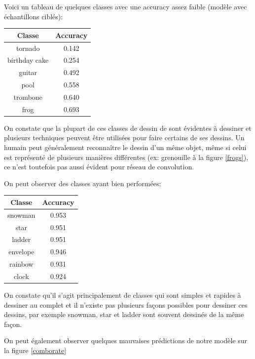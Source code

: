 Voici un tableau de quelques classes avec une accuracy assez faible (modèle avec échantillons ciblés):
\begin{center}
\begin{tabular}{|c|c|}
\hline
\textbf{Classe} & \textbf{Accuracy} \\ \hline
tornado & 0.142 \\ \hline
birthday cake & 0.254 \\ \hline
guitar & 0.492 \\ \hline
pool & 0.558 \\ \hline
trombone & 0.640 \\ \hline
frog & 0.693 \\ \hline
\end{tabular}
\end{center}



On constate que la plupart de ces classes de dessin de sont évidentes à dessiner et plusieurs techniques peuvent être utilisées pour faire certains de ses dessins. Un humain peut généralement reconnaître le dessin d'un même objet, même si celui est représenté de plusieurs manières différentes (ex: grenouille à la figure \ref{frogs}), ce n'est toutefois pas aussi évident pour réseau de convolution. 

On peut observer des classes ayant bien performées: 

\begin{center}
\begin{tabular}{|c|c|}
\hline
\textbf{Classe} & \textbf{Accuracy} \\ \hline
snowman & 0.953 \\ \hline
star & 0.951 \\ \hline
ladder & 0.951 \\ \hline
envelope & 0.946 \\ \hline
rainbow & 0.931 \\ \hline
clock & 0.924 \\ \hline
\end{tabular}
\end{center}


On constate qu'il s'agit principalement de classes qui sont simples et rapides à dessiner au complet et il n'existe pas plusieurs façons possibles pour dessiner ces dessins, par exemple snowman, star et ladder sont souvent dessinés de la même façon.


On peut également observer quelques mauvaises prédictions de notre modèle sur la figure \ref{comborate}

